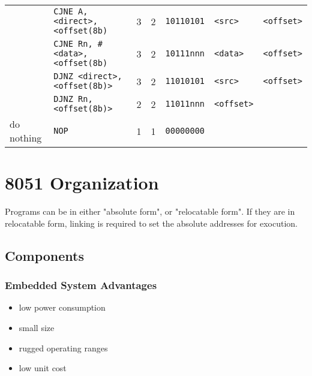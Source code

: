 \documentclass[journal]{IEEEtran}
\begin{document}
{{\begin{tabular}{|l|l|l|l|l|l|l|}
		& \texttt{CJNE A, <direct>, <offset(8b)} & 3 & 2 & \texttt{10110101} & \texttt{<src>} & \texttt{<offset>} \\
		& \texttt{CJNE Rn, \#<data>, <offset(8b)} & 3 & 2 & \texttt{10111nnn} & \texttt{<data>} & \texttt{<offset>} \\
		& \texttt{DJNZ <direct>, <offset(8b)>} & 3 & 2 & \texttt{11010101} & \texttt{<src>} & \texttt{<offset>} \\
		& \texttt{DJNZ Rn, <offset(8b)>} & 2 & 2 & \texttt{11011nnn} & \texttt{<offset>} & \\
		\hline
		do nothing
		& \texttt{NOP} & 1 & 1 & \texttt{00000000} & & \\
		\hline
	\end{tabular}
} %


\section{8051 Organization}
Programs can be in either "absolute form", or "relocatable form".
If they are in relocatable form,
linking is required to set the absolute addresses for exocution.


\subsection{Components}
\subsubsection{Embedded System Advantages}
\begin{itemize}
	\item low power consumption
	\item small size
	\item rugged operating ranges
	\item low unit cost
\end{itemize}

}
\end{document}

